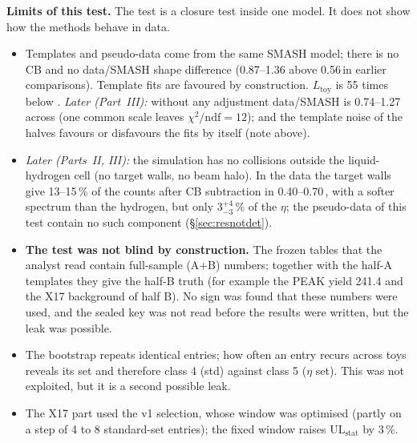 \textbf{Limits of this test.} The test is a closure test inside one model. It does not show how
the methods behave in data.
\begin{itemize}
\item Templates and pseudo-data come from the same SMASH model; there is no CB and no data/SMASH
      shape difference (0.87--1.36 above 0.56\,\GeVcc in earlier comparisons). Template fits are
      favoured by construction. $L_{\mathrm{toy}}$ is 55 times below \Ldata. \emph{Later (Part~III):} without any
      adjustment data/SMASH is 0.74--1.27 across \Mfour (one common scale leaves $\chi^2/\mathrm{ndf}=12$); and the
      template noise of the halves favours or disfavours the fits by itself (note above).
\item \emph{Later (Parts~II, III):} the simulation has no collisions outside the liquid-hydrogen cell (no target walls,
      no beam halo). In the data the target walls give 13--15\,\% of the counts after CB subtraction in
      0.40--0.70\,\GeVcc, with a softer \Mfour spectrum than the hydrogen, but only $3^{+4}_{-3}$\,\% of the $\eta$; the
      pseudo-data of this test contain no such component (\S\ref{sec:resnotdet}).
\item \textbf{The test was not blind by construction.} The frozen tables that the analyst read
      contain full-sample (A+B) numbers; together with the half-A templates they give the half-B
      truth (for example the PEAK yield 241.4 and the X17 background of half B). No sign was found
      that these numbers were used, and the sealed key was not read before the results were
      written, but the leak was possible.
\item The bootstrap repeats identical entries; how often an entry recurs across toys reveals its set and
      therefore class 4 (std) against class 5 ($\eta$ set). This was not exploited, but it is a
      second possible leak.
\item The X17 part used the v1 selection, whose \Mfour window was optimised (partly on a step of
      4 to 8 standard-set entries); the fixed window raises $\mathrm{UL}_{\mathrm{stat}}$ by 3\,\%.
\end{itemize}

